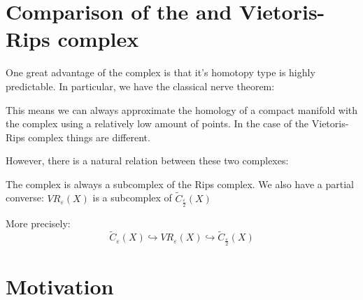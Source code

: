 \section{Comparison of the {\Cech} and Vietoris-Rips complex}

One great advantage of the {\Cech} complex is that it's homotopy type is highly predictable.
In particular, we have the classical {\Cech} nerve theorem:

This means we can always approximate the homology of a compact
manifold with the {\Cech} complex using a relatively low amount of points.
In the case of the Vietoris-Rips complex things are different.


However, there is a natural relation between these two complexes:

\begin{proposition}
The {\Cech} complex is always a subcomplex of the Rips complex. 
We also have a partial converse:
$VR_\varepsilon(X)$ is a subcomplex of $\tilde C_\frac{\varepsilon}{2}(X)$

More precisely:
$$
\tilde C_\varepsilon(X)
\hookrightarrow
VR_\varepsilon(X)
\hookrightarrow
\tilde C_\frac{\varepsilon}{2}(X)
$$
\end{proposition}


\section{Motivation}






%
%
%
%
%
%
%
%


